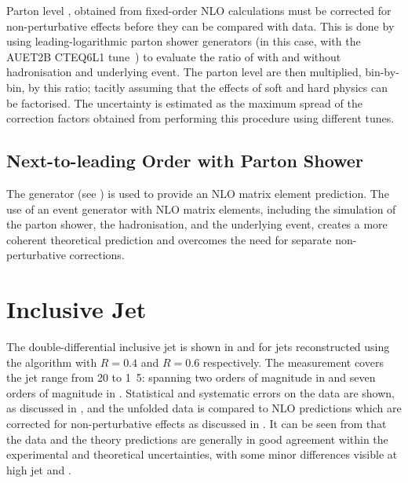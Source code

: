 Parton level , obtained from fixed-order NLO calculations must be
corrected for non-perturbative effects before they can be compared with data. This
is done by using leading-logarithmic parton shower generators (in this case, \Pythia
with the AUET2B CTEQ6L1 tune~\cite{Pumplin:2002:CTEQ6L1}) to evaluate the ratio of  with and without
hadronisation and underlying event. The parton level  are then multiplied,
bin-by-bin, by this ratio; tacitly assuming that the effects of soft and hard physics can be
factorised. The uncertainty is estimated as the maximum spread of the correction
factors obtained from performing this procedure using different \Pythia tunes.

\subsection{Next-to-leading Order \MC with Parton Shower}
The \Powheg generator (see ) is used to provide
an NLO matrix element prediction. The use of an event generator with NLO matrix elements,
including the simulation of the parton shower, the hadronisation, and the underlying
event, creates a more coherent theoretical prediction and overcomes the need for
separate non-perturbative corrections.

\section{Inclusive Jet }
The double-differential inclusive jet \xs is shown in 
and  for jets reconstructed
using the \akt algorithm with $R=0.4$ and $R=0.6$ respectively. The measurement
covers the jet \pT range from \unit{20}{\GeV} to \unit{1.5}{\TeV}: spanning two orders
of magnitude in \pT and seven orders of magnitude in \xs. Statistical and
systematic errors on the data are shown, as discussed in ,
and the unfolded data is compared to NLO \pQCD predictions which are corrected
for non-perturbative effects as discussed in .
It can be seen from  that the data and
the theory predictions are generally in good agreement within the experimental and
theoretical uncertainties, with some minor differences visible at high jet \pT and
\absRap.

